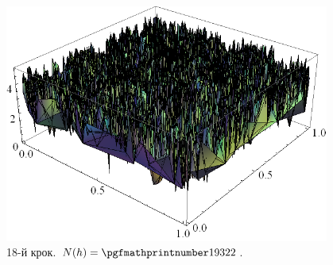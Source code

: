 \begin{frame}[allowframebreaks]
		\begin{figure}[H]
			\begin{columns}
			 	\begin{column}{0.7\textwidth}
			 		\includegraphics[width=\textwidth]{problem1/my/AEE/18}
			 	 \end{column}
			     \begin{column}{0.3\textwidth}
			     	\caption*{18-й крок. $N(h) = \nn{19322}$.}
			     \end{column}
		     \end{columns}
		\end{figure}
\end{frame}






